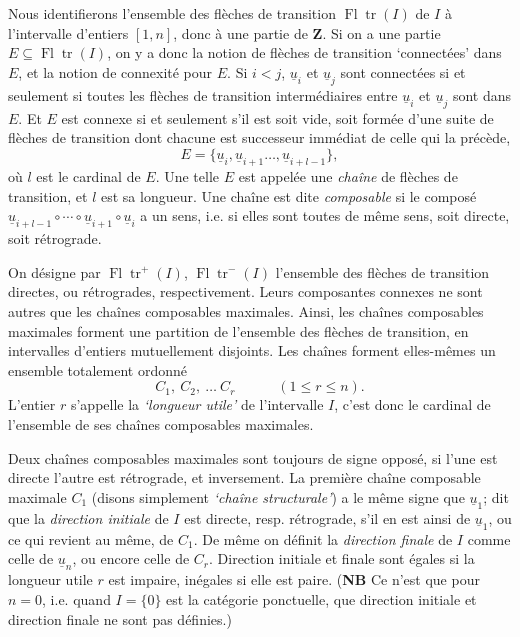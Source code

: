 \documentclass[11pt]{article}
\newcommand{\printedpage}[1]{\marginpar{\footnotesize p.~#1}}
\newcommand{\msp}[1]{\marginpar{\footnotesize [#1]}}
\newcommand{\Fltr}{\operatorname{Fl}\operatorname{tr}}
\begin{document}
Nous identifierons l'ensemble des flèches de transition $\Fltr(I)$ de $I$ à l'intervalle d'entiers $[1,n]$, donc à une partie de $\mathbf{Z}$. Si on a une partie $E\subseteq\Fltr(I)$, on y a donc la notion de flèches de transition ‘connectées’ dans $E$, et la notion de connexité pour $E$. Si $i<j$, $\underline{u}_i$ et $\underline{u}_j$ sont connectées si et seulement si toutes les flèches de transition intermédiaires entre $\underline{u}_i$ et $\underline{u}_j$ sont dans $E$. Et $E$ est connexe si et seulement s'il est soit vide, soit formée d'une suite de flèches de transition dont chacune est successeur immédiat de celle qui la précède, %
\[
E=\{\underline{u}_i,\underline{u}_{i+1}\ldots,\underline{u}_{i+l-1}\}, %
\]
où $l$ est le cardinal de $E$. Une telle $E$ est appelée une \textit{chaîne} de flèches de transition, et $l$ est sa longueur. Une chaîne est dite \textit{composable} si le composé $\underline{u}_{i+l-1}\circ\cdots\circ\underline{u}_{i+1}\circ\underline{u}_i$ a un sens, i.e. si elles sont toutes de même sens, soit directe, soit rétrograde.

On désigne par $\Fltr^+(I)$, $\Fltr^-(I)$ l'ensemble des flèches de transition directes, ou rétrogrades, respectivement. Leurs composantes connexes ne sont autres que les chaînes composables maximales. Ainsi, les chaînes composables maximales forment une partition de l'ensemble des flèches de transition, en intervalles d'entiers mutuellement disjoints. Les chaînes forment elles-mêmes un ensemble totalement ordonné
\[
C_1,\ C_2,\ \ldots\ C_r\qquad\quad(1\leq r\leq n).
\]
L'entier $r$ s'appelle la \textit{‘longueur utile’} de l'intervalle
\msp{page 4}
$I$, c'est donc le cardinal de l'ensemble de ses chaînes composables maximales.

Deux chaînes composables maximales sont toujours de signe opposé, si l'une est directe l'autre est rétrograde, et inversement. La première chaîne composable maximale $C_1$ (disons simplement \textit{‘chaîne structurale’}) a le même signe que $\underline{u}_1$; dit que la \textit{direction initiale} de $I$ est directe, resp. rétrograde, s'il en est ainsi de $\underline{u}_1$, ou ce qui revient au même, de $C_1$. De même on définit la \textit{direction finale} de $I$ comme celle de $\underline{u}_n$, ou encore celle de $C_r$. Direction initiale et finale sont égales si la longueur utile $r$ est
\printedpage{3}
impaire, inégales si elle est paire. (\textbf{NB} Ce n'est que pour $n=0$, i.e. quand $I=\{0\}$ est la catégorie ponctuelle, que direction initiale et direction finale ne sont pas définies.)
\end{document}
